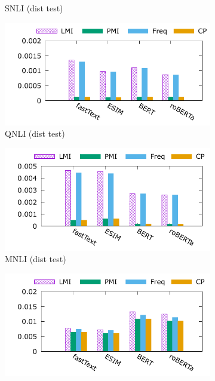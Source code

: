 \begin{figure}[th]
\begin{subfigure}[b]{0.24\textwidth}
\caption{SNLI (dist test)}
\label{fig:d_cue_snli}
\end{subfigure}
\hfill
\begin{subfigure}[b]{0.24\textwidth}
\centering
\includegraphics[width=\columnwidth]{data/dist_qnli.pdf}
\caption{QNLI (dist test)}
\label{fig:d_cue_qnli}
\end{subfigure}
\hfill
\begin{subfigure}[b]{0.24\textwidth}
\centering
\includegraphics[width=\columnwidth]{data/dist_mnli.pdf}
\caption{MNLI (dist test)}
\label{fig:d_cue_mnli}
\end{subfigure}
\hfill
\begin{subfigure}[b]{0.24\textwidth}
\centering
\includegraphics[width=\columnwidth]{data/dist_roc.pdf}

\end{subfigure}
\end{figure}
